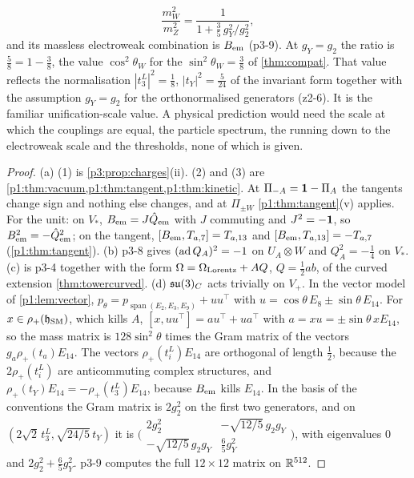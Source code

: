 \begin{theorem}
\begin{enumerate}[label=(\alph*),leftmargin=2.2em]
\[
\frac{m_W^2}{m_Z^2}=\frac1{1+\tfrac35\,g_Y^2/g_2^2},
\]
and its massless electroweak combination is $B_{\rm em}$ (p3-9). At $g_Y=g_2$ the ratio is $\tfrac58=1-\tfrac38$, the value $\cos^2\theta_W$ for the
$\sin^2\theta_W=\tfrac38$ of \cref{thm:compat}. That value reflects the normalisation $|t^L_3|^2=\tfrac18$, $|t_Y|^2=\tfrac5{24}$ of the invariant form together with
the assumption $g_Y=g_2$ for the orthonormalised generators (z2-6). It is the familiar unification-scale value. A physical prediction would need the scale at
which the couplings are equal, the particle spectrum, the running down to the electroweak scale and the thresholds, none of which is given.
\end{enumerate}
\end{theorem}

\begin{proof}
(a) (1) is \cref{p3:prop:charges}(ii). (2) and (3) are \cref{p1:thm:vacuum,p1:thm:tangent,p1:thm:kinetic}. At $\Pi_{-A}=\mathbf 1-\Pi_A$ the tangents change sign and nothing
else changes, and at $\Pi_{\pm W}$ \cref{p1:thm:tangent}(v) applies. For the unit: on $V_*$, $B_{\rm em}=J\hat Q_{\rm em}$ with $J$ commuting and $J^2=-\mathbf 1$, so
$B_{\rm em}^2=-\hat Q_{\rm em}^2$; on the tangent, $[B_{\rm em},T_{a,7}]=T_{a,13}$ and $[B_{\rm em},T_{a,13}]=-T_{a,7}$ (\cref{p1:thm:tangent}). (b) p3-8 gives
$(\operatorname{ad} Q_A)^2=-1$ on $U_A\otimes W$ and $Q_A^2=-\tfrac14$ on $V_*$. (c) is p3-4 together with the form $\Omega=\Omega_{\rm Lorentz}+AQ$, $Q=\tfrac12ab$, of the curved
extension \cref{thm:towercurved}. (d) $\mathfrak{su}(3)_C$ acts trivially on $V_+$. In the vector model of \cref{p1:lem:vector}, $p_\theta=p_{\operatorname{span}(E_2,E_3,E_9)}+uu^{\!\top}$ with
$u=\cos\theta\,E_8\pm\sin\theta\,E_{14}$. For $x\in\rho_+(\mathfrak h_{\rm SM})$, which kills $A$, $[x,uu^{\!\top}]=au^{\!\top}+ua^{\!\top}$ with $a=xu=\pm\sin\theta\,xE_{14}$, so
the mass matrix is $128\sin^2\theta$ times the Gram matrix of the vectors $g_a\rho_+(t_a)E_{14}$. The vectors $\rho_+(t^L_i)E_{14}$ are orthogonal of length $\tfrac12$,
because the $2\rho_+(t^L_i)$ are anticommuting complex structures, and $\rho_+(t_Y)E_{14}=-\rho_+(t^L_3)E_{14}$, because $B_{\rm em}$ kills $E_{14}$. In the basis of the
conventions the Gram matrix is $2g_2^2$ on the first two generators, and on $(2\sqrt2\,t^L_3,\sqrt{24/5}\,t_Y)$ it is
$\bigl(\begin{smallmatrix}2g_2^2&-\sqrt{12/5}\,g_2g_Y\\-\sqrt{12/5}\,g_2g_Y&\frac65g_Y^2\end{smallmatrix}\bigr)$, with eigenvalues $0$ and $2g_2^2+\tfrac65g_Y^2$. p3-9 computes
the full $12\times12$ matrix on $\mathbb{R}^{512}$.
\end{proof}

